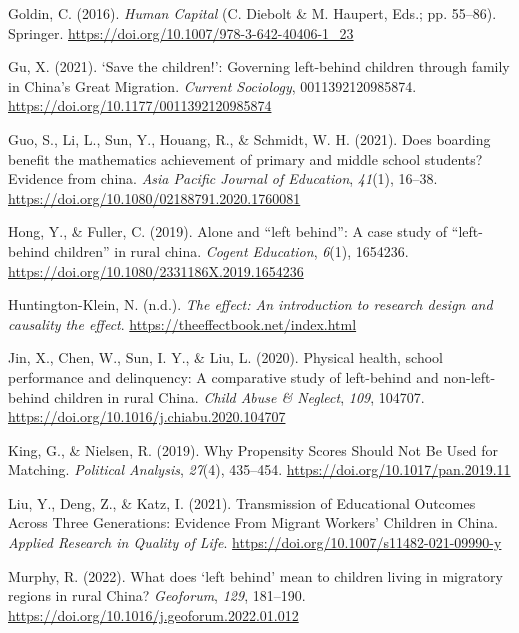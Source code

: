 \documentclass[
  man,floatsintext]{apa7}
\newlength{\cslhangindent}
\newlength{\cslentryspacingunit} %
\newenvironment{CSLReferences}[2] %
 {%
  \setlength{\parindent}{0pt}
  \ifodd #1
  \let\oldpar\par
  \def\par{\hangindent=\cslhangindent\oldpar}
  \fi
  \setlength{\parskip}{#2\cslentryspacingunit}
 }%
 {}
\begin{document}
\begin{CSLReferences}{1}{0}
\leavevmode{}%
Goldin, C. (2016). \emph{Human Capital} (C. Diebolt \& M. Haupert, Eds.; pp. 55--86). Springer. \url{https://doi.org/10.1007/978-3-642-40406-1_23}

\leavevmode{}%
Gu, X. (2021). {`}Save the children!{'}: Governing left-behind children through family in China{'}s Great Migration. \emph{Current Sociology}, 0011392120985874. \url{https://doi.org/10.1177/0011392120985874}

\leavevmode{}%
Guo, S., Li, L., Sun, Y., Houang, R., \& Schmidt, W. H. (2021). Does boarding benefit the mathematics achievement of primary and middle school students? Evidence from china. \emph{Asia Pacific Journal of Education}, \emph{41}(1), 16--38. \url{https://doi.org/10.1080/02188791.2020.1760081}

\leavevmode{}%
Hong, Y., \& Fuller, C. (2019). Alone and {``}left behind{''}: A case study of {``}left-behind children{''} in rural china. \emph{Cogent Education}, \emph{6}(1), 1654236. \url{https://doi.org/10.1080/2331186X.2019.1654236}

\leavevmode{}%
Huntington-Klein, N. (n.d.). \emph{The effect: An introduction to research design and causality \textbar{} the effect}. \url{https://theeffectbook.net/index.html}

\leavevmode{}%
Jin, X., Chen, W., Sun, I. Y., \& Liu, L. (2020). Physical health, school performance and delinquency: A comparative study of left-behind and non-left-behind children in rural China. \emph{Child Abuse \& Neglect}, \emph{109}, 104707. \url{https://doi.org/10.1016/j.chiabu.2020.104707}

\leavevmode{}%
King, G., \& Nielsen, R. (2019). Why Propensity Scores Should Not Be Used for Matching. \emph{Political Analysis}, \emph{27}(4), 435--454. \url{https://doi.org/10.1017/pan.2019.11}

\leavevmode{}%
Liu, Y., Deng, Z., \& Katz, I. (2021). Transmission of Educational Outcomes Across Three Generations: Evidence From Migrant Workers{'} Children in China. \emph{Applied Research in Quality of Life}. \url{https://doi.org/10.1007/s11482-021-09990-y}

\leavevmode{}%
Murphy, R. (2022). What does {`}left behind{'} mean to children living in migratory regions in rural China? \emph{Geoforum}, \emph{129}, 181--190. \url{https://doi.org/10.1016/j.geoforum.2022.01.012}


\end{CSLReferences}
\end{document}
